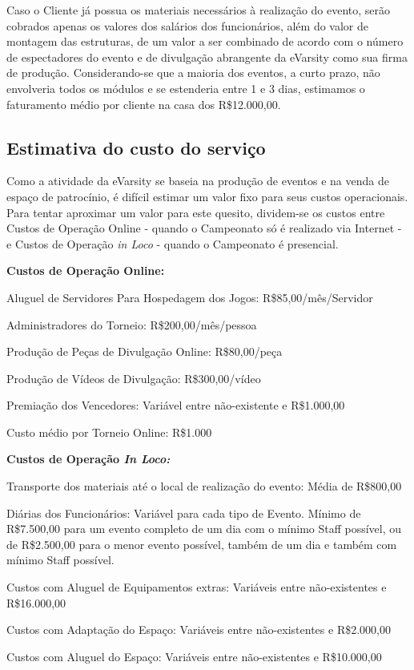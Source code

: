 \documentclass[a4paper, 12pt]{paper}
\begin{document}
Caso o Cliente já possua os materiais necessários à realização do evento, serão cobrados apenas os valores dos salários dos funcionários, além do valor de montagem das estruturas, de um valor a ser combinado de acordo com o número de espectadores do evento e de divulgação abrangente da eVarsity como sua firma de produção.
Considerando-se que a maioria dos eventos, a curto prazo, não envolveria todos os módulos e se estenderia entre 1 e 3 dias, estimamos o faturamento médio por cliente na casa dos R\$12.000,00.
\subsection{Estimativa do custo do serviço}
Como a atividade da eVarsity se baseia na produção de eventos e na venda de espaço de patrocínio, é difícil estimar um valor fixo para seus custos operacionais. Para tentar aproximar um valor para este quesito, dividem-se os custos entre Custos de Operação Online - quando o Campeonato só é realizado via Internet - e Custos de Operação \textit{in Loco} - quando o Campeonato é presencial.

\textbf{Custos de Operação Online:}

Aluguel de Servidores Para Hospedagem dos Jogos: R\$85,00/mês/Servidor

Administradores do Torneio: R\$200,00/mês/pessoa

Produção de Peças de Divulgação Online: R\$80,00/peça

Produção de Vídeos de Divulgação: R\$300,00/vídeo

Premiação dos Vencedores: Variável entre não-existente e R\$1.000,00


Custo médio por Torneio Online: R\$1.000

\textbf{Custos de Operação \textit{In Loco:}}

Transporte dos materiais até o local de realização do evento: Média de R\$800,00

Diárias dos Funcionários: Variável para cada tipo de Evento. Mínimo de R\$7.500,00 para um evento completo de um dia com o mínimo Staff possível, ou de R\$2.500,00 para o menor evento possível, também de um dia e também com mínimo Staff possível.

Custos com Aluguel de Equipamentos extras: Variáveis entre não-existentes e R\$16.000,00

Custos com Adaptação do Espaço: Variáveis entre não-existentes e R\$2.000,00

Custos com Aluguel do Espaço: Variáveis entre não-existentes e R\$10.000,00
\end{document}
